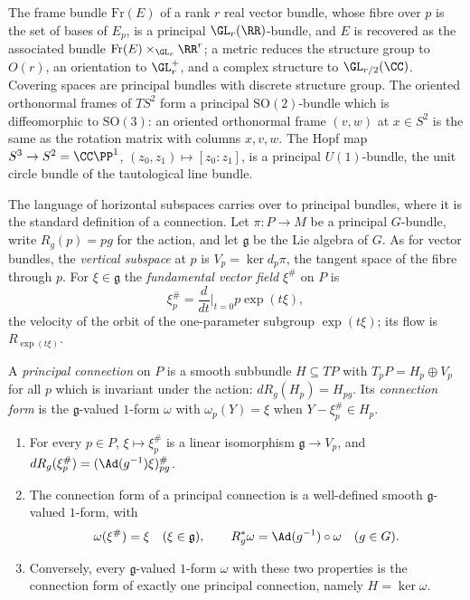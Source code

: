 \begin{example}\label{connections:example-principal}
The frame bundle $\mathrm{Fr}(E)$ of a rank $r$ real vector bundle, whose fibre over $p$ is the set of bases of $E_p$, is a principal $\GL_r(\RR)$-bundle, and $E$ is recovered as the associated bundle
$\mathrm{Fr}(E) \times_{\GL_r}\RR^r$; a metric reduces the structure group to $O(r)$, an orientation to $\GL_r^+$, and a complex structure to $\GL_{r/2}(\CC)$. Covering spaces are principal bundles with
discrete structure group. The oriented orthonormal frames of $TS^2$ form a principal $\mathrm{SO}(2)$-bundle which is diffeomorphic to $\mathrm{SO}(3)$: an oriented orthonormal
frame $(v, w)$ at $x \in S^2$ is the same as the rotation matrix with columns $x, v, w$. The Hopf map $S^3 \to S^2 = \CC\PP^1$, $(z_0, z_1) \mapsto [z_0 : z_1]$, is a principal
$U(1)$-bundle, the unit circle bundle of the tautological line bundle.
\end{example}


The language of horizontal subspaces carries over to principal bundles, where it is the standard definition of a connection. Let $\pi \colon P \to M$ be a principal $G$-bundle, write
$R_g(p) = pg$ for the action, and let $\mathfrak{g}$ be the Lie algebra of $G$. As for vector bundles, the \emph{vertical subspace} at $p$ is $V_p = \ker d_p\pi$, the tangent space of the fibre
through $p$. For $\xi \in \mathfrak{g}$ the \emph{fundamental vector field} $\xi^\#$ on $P$ is
\[
\xi^\#_p = \frac{d}{dt}\Big|_{t=0}p\exp(t\xi),
\]
the velocity of the orbit of the one-parameter subgroup $\exp(t\xi)$; its flow is $R_{\exp(t\xi)}$.

\begin{definition}\label{connections:definition-principal-connection}
A \emph{principal connection} on $P$ is a smooth subbundle $H \subseteq TP$ with $T_pP = H_p \oplus V_p$ for all $p$ which is invariant under the action: $dR_g(H_p) = H_{pg}$. Its
\emph{connection form} is the $\mathfrak{g}$-valued $1$-form $\omega$ with $\omega_p(Y) = \xi$ when $Y - \xi^\#_p \in H_p$.
\end{definition}

\begin{proposition}\label{connections:proposition-connection-one-form}
\begin{enumerate}
\item For every $p \in P$, $\xi \mapsto \xi^\#_p$ is a linear isomorphism $\mathfrak{g} \to V_p$, and $dR_g(\xi^\#_p) = (\Ad(g^{-1})\xi)^\#_{pg}$.
\item The connection form of a principal connection is a well-defined smooth $\mathfrak{g}$-valued $1$-form, with
\[
\omega(\xi^\#) = \xi \quad (\xi \in \mathfrak{g}), \qquad R_g^*\omega = \Ad(g^{-1}) \circ \omega \quad (g \in G).
\]
\item Conversely, every $\mathfrak{g}$-valued $1$-form $\omega$ with these two properties is the connection form of exactly one principal connection, namely $H = \ker\omega$.
\end{enumerate}
\end{proposition}

